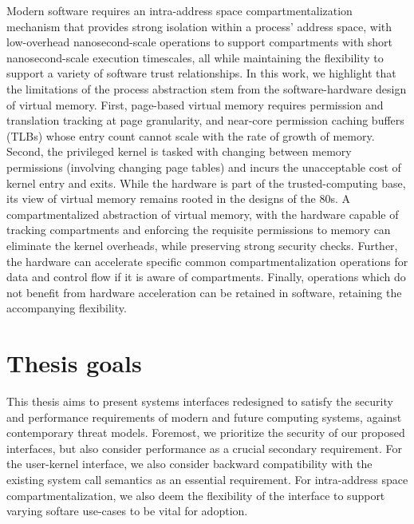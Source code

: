 Modern software requires an intra-address space compartmentalization mechanism
that provides strong isolation within a process' address space, with
low-overhead nanosecond-scale operations to support compartments with short
nanosecond-scale execution timescales, all while maintaining the flexibility
to support a variety of software trust relationships.
In this work, we highlight that the limitations of the process abstraction
stem from the software-hardware design of virtual memory.
First, page-based virtual memory requires permission and translation tracking
at page granularity, and near-core permission caching buffers (TLBs) whose
entry count cannot scale with the rate of growth of memory.
Second, the privileged kernel is tasked with changing between memory 
permissions (involving changing page tables) and incurs the unacceptable
cost of kernel entry and exits.
While the hardware is part of the trusted-computing base, its view of virtual
memory remains rooted in the designs of the 80s.
A compartmentalized abstraction of virtual memory, with the hardware capable
of tracking compartments and enforcing the requisite permissions to memory
can eliminate the kernel overheads, while preserving strong security checks.
Further, the hardware can accelerate specific common compartmentalization
operations for data and control flow if it is aware of compartments.
Finally, operations which do not benefit from hardware acceleration can
be retained in software, retaining the accompanying flexibility.

\section{Thesis goals}

This thesis aims to present systems interfaces redesigned to satisfy the
security and performance requirements of modern and future computing 
systems, against contemporary threat models.
Foremost, we prioritize the security of our proposed interfaces, but also
consider performance as a crucial secondary requirement.
For the user-kernel interface, we also consider backward compatibility with
the existing system call semantics as an essential requirement.
For intra-address space compartmentalization, we also deem the flexibility
of the interface to support varying softare use-cases to be vital for adoption.


